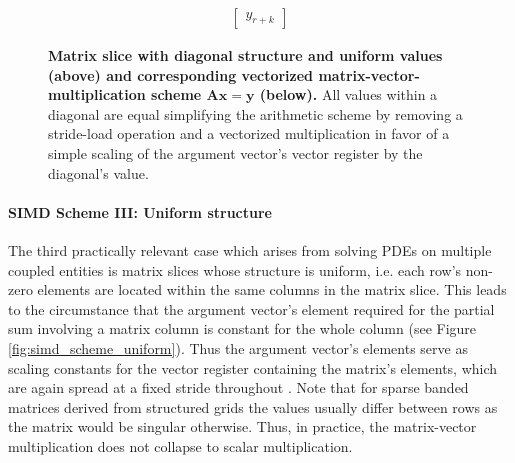 \begin{figure}[ht]
$$\begin{matrix}
\begin{bmatrix}
                                                                                                                 y_{r+k}
                                                                                                                \end{bmatrix}
        \end{matrix}
        $$
        \caption[Matrix slice with diagonal structure and uniform values and corresponding vectorized matrix-vector-multiplication scheme.]{\textbf{Matrix slice with diagonal structure and uniform values (above) and corresponding vectorized matrix-vector-multiplication scheme $\bm{Ax = y}$ (below).} All values within a diagonal are equal simplifying the arithmetic scheme by removing a stride-load operation and a vectorized multiplication in favor of a simple scaling of the argument vector's vector register by the diagonal's value.}
        \label{fig:simd_scheme_diag_collated}
      \end{figure}

      \paragraph{SIMD Scheme III: Uniform structure}

      The third practically relevant case which arises from solving PDEs on multiple coupled entities is matrix slices whose structure is uniform, i.e. each row's non-zero elements are located within the same columns in the matrix slice. This leads to the circumstance that the argument vector's element required for the partial sum involving a matrix column is constant for the whole column (see Figure \ref{fig:simd_scheme_uniform}). Thus the argument vector's elements serve as scaling constants for the vector register containing the matrix's elements, which are again spread at a fixed stride throughout \V. Note that for sparse banded matrices derived from structured grids the values usually differ between rows as the matrix would be singular otherwise. Thus, in practice, the matrix-vector multiplication does not collapse to scalar multiplication.


